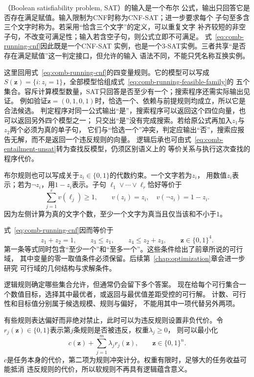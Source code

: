 （Boolean satisfiability problem, SAT）的输入是一个布尔
公式，输出只回答它是否存在满足赋值。输入限制为CNF时称为CNF-SAT；进一步要求每个
子句至多含三个文字时称为。若采用“恰含三个文字”的定义，可以重复文字
补齐较短的非空子句，不改变可满足性；输入若含空子句，则公式立即不可满足。
式~\eqref{eq:comb-running-cnf}因此既是一个CNF-SAT
实例，也是一个3-SAT实例。三者共享“是否存在满足赋值”这一判定接口，但允许的输入
语法不同，不能只凭名称互换实例。

这里回用式~\eqref{eq:comb-running-cnf}的四变量规则。它的模型可以写成
$S(\bm z)=\{i:z_i=1\}$，全部模型恰组成式~\eqref{eq:comb-running-feasible-family}的
五个集合。容斥计算模型数量，SAT只回答是否至少有一个；搜索程序还需实际输出见证。
例如验证$\bm z=(0,1,0,1)$时，恰选一个、依赖与前提规则均成立，所以它是合法候选。
判定程序对同一公式输出“是”，搜索程序可以返回这个四位向量，也可以返回另外四个模型之一；
只交出“是”没有完成搜索。若给原公式再加入$z_1$与$z_2$两个必须为真的单子句，
它们与“恰选一个”冲突，判定应输出“否”，搜索应报告无解，而不是返回一个违反规则的向量。
逻辑后承也可由式~\eqref{eq:comb-entailment-unsat}转为查找反模型，仍须区别语义上的
等价关系与执行这次查找的程序代价。

布尔规则也可以写成关于$z_i\in\{0,1\}$的代数约束。一个文字若为$z_i$，
用数值$z_i$表示；若为$\neg z_i$，用$1-z_i$表示。子句
$\ell_1\lor\cdots\lor\ell_r$恰好等价于
\begin{equation}
  \sum_{j=1}^{r}v(\ell_j)\geq1,
  \qquad
  v(z_i)=z_i,\quad v(\neg z_i)=1-z_i.
  \label{eq:comb-clause-linearization}
\end{equation}
因为左侧计算为真的文字个数，至少一个文字为真当且仅当该和不小于$1$。

式~\eqref{eq:comb-running-cnf}因而等价于
\begin{equation}
  z_1+z_2=1,\qquad
  z_3\leq z_1,\qquad
  z_4\leq z_2+z_3,\qquad
  \bm{z}\in\{0,1\}^4.
  \label{eq:comb-running-integer-constraints}
\end{equation}
第一条等式同时包含“至少一个”和“至多一个”。这些条件给出了前章所说的可行域，
其中变量的零一取值条件必须保留。后续第~\ref{chap:optimization}章会进一步研究
可行域的几何结构与求解条件。

\label{sec:comb-optimization-submodularity}

逻辑规则确定哪些集合允许，但通常仍会留下多个答案。
现在给每个可行集合一个数值目标，选择其中最优者，或返回与最优值差距受控的可行解。
计数、可行性和目标值分别属于候选规模、规则与偏好，
不能用其中一项代替另外两项。

有些规则表达偏好而非绝对禁止，此时可以为违反规则设置非负代价。令
$r_j(\bm{z})\in\{0,1\}$表示第$j$条规则是否被违反，权重$\lambda_j\geq0$，
则可以最小化
\begin{equation}
  c(\bm{z})+\sum_{j=1}^{m}\lambda_j r_j(\bm{z}),
  \qquad
  \bm{z}\in\{0,1\}^n.
  \label{eq:comb-soft-constraint-objective}
\end{equation}
$c$是任务本身的代价，第二项为规则冲突计分。权重有限时，足够大的任务收益可能抵消
违反规则的代价，所以软规则不再具有逻辑蕴含意义。

